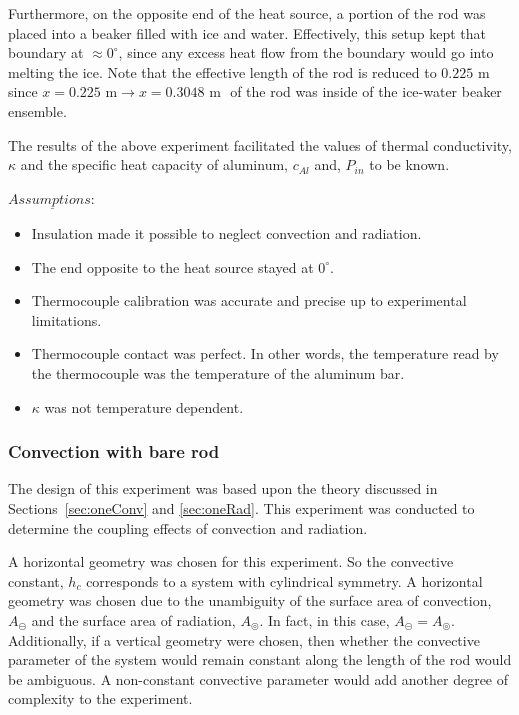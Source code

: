 \documentclass[10pt,aps,prb,twocolumn, nofootinbib]{revtex4-1}
\begin{document}
Furthermore, on the opposite end of the heat source, a portion of the rod was placed into a beaker filled with ice and water. Effectively, this setup kept that boundary at $\approx 0^\circ$, since any excess heat flow from the boundary would go into melting the ice. Note that the effective length of the rod is reduced to $0.225 \text{ m}$ since $x=0.225 \text{ m}\to x=0.3048 \text{ m }$ of the rod was inside of the ice-water beaker ensemble.

The results of the above experiment facilitated the values of thermal conductivity, $\kappa$ and the specific heat capacity of aluminum, $c_{Al}$ and, $P_{in}$ to be known. 

\bigskip 
\noindent $\underline{Assumptions:}$

\begin{itemize}\parskip0pt
    	\item Insulation made it possible to neglect convection and radiation.
    	\medskip
    	\item The end opposite to the heat source stayed at $0^\circ$.
    	\medskip
    	\item Thermocouple calibration was accurate and precise up to experimental limitations.
    	\medskip
    	\item Thermocouple contact was perfect. In other words, the temperature read by the thermocouple was the temperature of the aluminum bar.
    	\medskip
    	\item $\kappa$ was not temperature dependent.
\end{itemize} 

\subsubsection{\label{sec:twoConvbare}Convection with bare rod}
The design of this experiment was based upon the theory discussed in Sections~\ref{sec:oneConv} and \ref{sec:oneRad}. This experiment was conducted to determine the coupling effects of convection and radiation.

A horizontal geometry was chosen for this experiment. So the convective constant, $h_c$ corresponds to a system with cylindrical symmetry. A horizontal geometry was chosen due to the unambiguity of the surface area of convection, $A_{\circleddash}$ and the surface area of radiation, $A_{\circledcirc}$. In fact, in this case, $A_{\circleddash} = A_{\circledcirc}$. Additionally, if a vertical geometry were chosen, then whether the convective parameter of the system would remain constant along the length of the rod would be ambiguous. A non-constant convective parameter would add another degree of complexity to the experiment.
\end{document}
